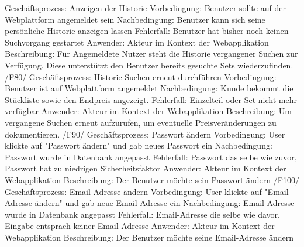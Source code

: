 Geschäftsprozess: Anzeigen der Historie\newline
Vorbedingung: Benutzer sollte auf der Webplattform angemeldet sein\newline
Nachbedingung: Benutzer kann sich seine persönliche Historie anzeigen lassen\newline
Fehlerfall: Benutzer hat bisher noch keinen Suchvorgang gestartet\newline
Anwender: Akteur im Kontext der Webapplikation\newline
Beschreibung: Für Angemeldete Nutzer steht die Historie vergangener Suchen zur Verfügung. Diese unterstützt den Benutzer bereits gesuchte Sets wiederzufinden.\newline\newline
/F80/ \newline
Geschäftsprozess: Historie Suchen erneut durchführen \newline
Vorbedingung: Benutzer ist auf Webplattform angemeldet \newline
Nachbedingung: Kunde bekommt die Stückliste sowie den Endpreis angezeigt.\newline 
Fehlerfall: Einzelteil oder Set nicht mehr verfügbar \newline
Anwender: Akteur im Kontext der Webapplikation \newline
Beschreibung: Um vergangene Suchen erneut aufzurufen, um eventuelle  Preisveränderungen zu dokumentieren. \newline \newline
/F90/ \newline
Geschäftsprozess: Passwort ändern \newline
Vorbedingung: User klickte auf "Passwort ändern" und gab neues Passwort ein \newline
Nachbedingung: Passwort wurde in Datenbank angepasst \newline
Fehlerfall: Passwort das selbe wie zuvor, Passwort hat zu niedrigen Sicherheitsfaktor \newline
Anwender: Akteur im Kontext der Webapplikation \newline
Beschreibung: Der Benutzer möchte sein Passwort ändern \newline \newline
/F100/ \newline
Geschäftsprozess: Email-Adresse ändern \newline
Vorbedingung: User klickte auf "Email-Adresse ändern" und gab neue Email-Adresse ein \newline
Nachbedingung: Email-Adresse wurde in Datenbank angepasst \newline
Fehlerfall: Email-Adresse die selbe wie davor, Eingabe entsprach keiner Email-Adresse \newline
Anwender: Akteur im Kontext der Webapplikation \newline
Beschreibung: Der Benutzer möchte seine Email-Adresse ändern \newline \newline
\newline \newline
